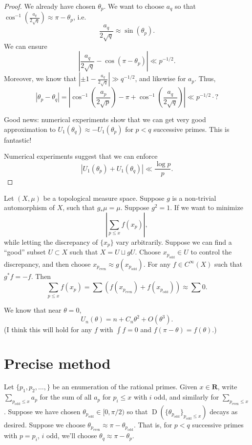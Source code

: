 \documentclass{article}
\DeclareMathOperator{\disc}{D}
\newcommand{\bR}{\mathbf{R}}
\newcommand{\even}{\mathrm{even}}
\newcommand{\odd}{\mathrm{odd}}
\begin{document}
\begin{proof}
We already have chosen $\theta_p$. We want to choose $a_q$ so that 
$\cos^{-1}(\frac{a_q}{2\sqrt q}) \approx \pi-\theta_p$, i.e.
\[
	\frac{a_q}{2\sqrt q} \approx \sin(\theta_p) .
\]
We can ensure 
\[
	\left| \frac{a_q}{2\sqrt q} - \cos(\pi - \theta_p)\right| \ll p^{-1/2} .
\]
Moreover, we know that $|\pm 1 - \frac{a_q}{2\sqrt q}| \gg q^{-1/2}$, and 
likewise for $a_p$. Thus, 
\[
	|\theta_p - \theta_q| = \left|\cos^{-1}\left(\frac{a_p}{2\sqrt p}\right) - \pi +  \cos^{-1}\left(\frac{a_q}{2\sqrt q}\right)\right| \ll p^{-1/2} \cdot ?
\]

Good news: numerical experiments show that we can get very good approximation 
to $U_1(\theta_q) \approx - U_1(\theta_p)$ for $p<q$ successive primes. This 
is fantastic!

Numerical experiments suggest that we can enforce 
\[
	|U_1(\theta_p)+U_1(\theta_q)| \ll \frac{\log p}{p} .
\]
\end{proof}

Let $(X,\mu)$ be a topological measure space. Suppose $g$ is a non-trivial 
automorphism of $X$, such that $g_\ast \mu = \mu$. Suppose $g^2=1$. If we 
want to minimize 
\[
	\left| \sum_{p\leqslant x} f(x_p)\right| ,
\]
while letting the discrepancy of $\{x_p\}$ vary arbitrarily. Suppose we can 
find a ``good'' subset $U\subset X$ such that $X = U \sqcup g U$. Choose 
$x_{p_\odd}\in U$ to control the discrepancy, and then choose 
$x_{p_\even} \approx g(x_{p_\odd})$. For any $f\in C^\infty(X)$ such that 
$g^\ast f = - f$. Then 
\[
	\sum_{p\leqslant x} f(x_p) = \sum (f(x_{p_\even}) + f(x_{p_\odd})) \approx \sum 0 .
\]

We know that near $\theta=0$, 
\[
	U_n(\theta) = n + C_n \theta^2 + O(\theta^3) .
\]
(I think this will hold for any $f$ with $\int f=0$ and
$f(\pi-\theta)=f(\theta)$.)





\section{Precise method}

Let $\{p_1,p_2,\dots,\}$ be an enumeration of the rational primes. Given 
$x\in \bR$, write $\sum_{p_\odd \leqslant x} a_p$ for the sum of all $a_p$ 
for $p_i\leqslant x$ with $i$ odd, and similarly for 
$\sum_{p_\even\leqslant x}$. Suppose we have chosen 
$\theta_{p_\odd}\in [0,\pi/2)$ so that 
$\disc(\{\theta_{p_\odd}\}_{p_\odd \leqslant x})$ decays as desired. Suppose 
we choose $\theta_{p_\even} \approx \pi - \theta_{p_\odd}$. That is, for 
$p < q$ successive primes with $p=p_i$, $i$ odd, we'll choose 
$\theta_q \approx \pi - \theta_p$. 
\end{document}
